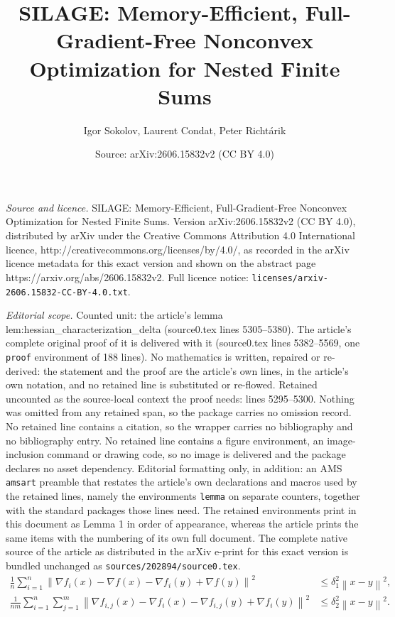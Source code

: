 \documentclass[10pt,a4paper]{amsart}
\title{SILAGE: Memory-Efficient, Full-Gradient-Free Nonconvex Optimization for Nested Finite Sums}
\author{Igor Sokolov, Laurent Condat, Peter Richt\'arik}
\date{Source: arXiv:2606.15832v2 (CC BY 4.0)}
\newcommand{\sqn}[1]{\left\| #1 \right\|^2}
\begin{document}
\maketitle

\noindent\emph{Source and licence.} SILAGE: Memory-Efficient, Full-Gradient-Free Nonconvex Optimization for Nested Finite Sums. Version arXiv:2606.15832v2 (CC BY 4.0), distributed by arXiv under the Creative Commons Attribution 4.0 International licence, http://creativecommons.org/licenses/by/4.0/, as recorded in the arXiv licence metadata for this exact version and shown on the abstract page https://arxiv.org/abs/2606.15832v2. Full licence notice: \texttt{licenses/arxiv-2606.15832-CC-BY-4.0.txt}.\par\smallskip

\noindent\textit{Editorial scope.} Counted unit: the article's lemma lem:hessian\_characterization\_delta (source0.tex lines 5305--5380). The article's complete original proof of it is delivered with it (source0.tex lines 5382--5569, one \texttt{proof} environment of 188 lines). No mathematics is written, repaired or re-derived: the statement and the proof are the article's own lines, in the article's own notation, and no retained line is substituted or re-flowed.  Retained uncounted as the source-local context the proof needs: lines 5295--5300.  Nothing was omitted from any retained span, so the package carries no omission record.  No retained line contains a citation, so the wrapper carries no bibliography and no bibliography entry.  No retained line contains a figure environment, an image-inclusion command or drawing code, so no image is delivered and the package declares no asset dependency.  Editorial formatting only, in addition: an AMS \texttt{amsart} preamble that restates the article's own declarations and macros used by the retained lines, namely the environments \texttt{lemma} on separate counters, together with the standard packages those lines need.  The retained environments print in this document as Lemma 1 in order of appearance, whereas the article prints the same items with the numbering of its own full document.  The complete native source of the article as distributed in the arXiv e-print for this exact version is bundled unchanged as \texttt{sources/202894/source0.tex}.
\begin{align}
\label{eq:exp_delta1}
\frac{1}{n}\sum_{i=1}^n \sqn{\nabla f_i(x)-\nabla f(x)-\nabla f_i(y)+\nabla f(y)} &\le \delta_1^2\sqn{x-y}, \\
\label{eq:exp_delta2}
\frac{1}{nm}\sum_{i=1}^n\sum_{j=1}^m \sqn{\nabla f_{i,j}(x)-\nabla f_i(x)-\nabla f_{i,j}(y)+\nabla f_i(y)} &\le \delta_2^2\sqn{x-y}.
\end{align}
\end{document}
